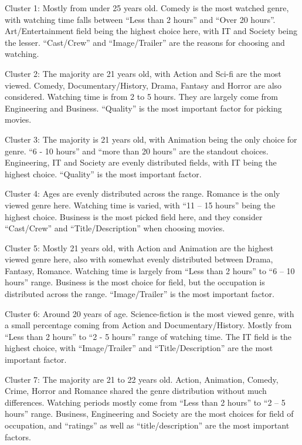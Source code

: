 Cluster 1: Mostly from under 25 years old. Comedy is the most watched genre, with watching time falls between “Less than 2 hours” and “Over 20 hours”. Art/Entertainment field being the highest choice here, with IT and Society being the lesser. “Cast/Crew” and “Image/Trailer” are the reasons for choosing and watching.
\newline

Cluster 2: The majority are 21 years old, with Action and Sci-fi are the most viewed. Comedy, Documentary/History, Drama, Fantasy and Horror are also considered. Watching time is from 2 to 5 hours. They are largely come from Engineering and Business. “Quality” is the most important factor for picking movies.
\newline

Cluster 3: The majority is 21 years old, with Animation being the only choice for genre. “6 - 10 hours” and “more than 20 hours” are the standout choices. Engineering, IT and Society are evenly distributed fields, with IT being the highest choice. “Quality” is the most important factor.
\newline

Cluster 4: Ages are evenly distributed across the range. Romance is the only viewed genre here. Watching time is varied, with “11 – 15 hours” being the highest choice. Business is the most picked field here, and they consider “Cast/Crew” and “Title/Description” when choosing movies.
\newline

Cluster 5: Mostly 21 years old, with Action and Animation are the highest viewed genre here, also with somewhat evenly distributed between Drama, Fantasy, Romance. Watching time is largely from “Less than 2 hours” to “6 – 10 hours” range. Business is the most choice for field, but the occupation is distributed across the range. “Image/Trailer” is the most important factor.
\newline

Cluster 6: Around 20 years of age. Science-fiction is the most viewed genre, with a small percentage coming from Action and Documentary/History. Mostly from “Less than 2 hours” to “2 - 5 hours” range of watching time. The IT field is the highest choice, with “Image/Trailer” and “Title/Description” are the most important factor. 
\newline

Cluster 7: The majority are 21 to 22 years old. Action, Animation, Comedy, Crime, Horror and Romance shared the genre distribution without much differences. Watching periods mostly come from “Less than 2 hours” to “2 – 5 hours” range. Business, Engineering and Society are the most choices for field of occupation, and “ratings” as well as “title/description” are the most important factors.

